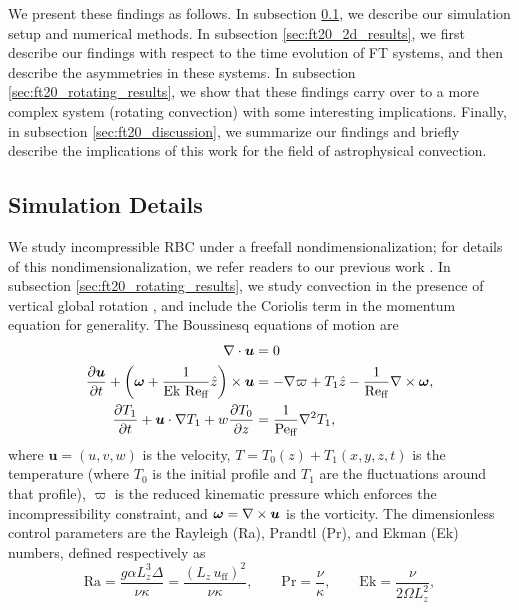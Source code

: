 We present these findings as follows.
In subsection \ref{sec:ft20_simulations}, we describe our simulation setup and numerical methods.
In subsection \ref{sec:ft20_2d_results}, we first describe our findings with respect to the time evolution of FT systems, and then describe the asymmetries in these systems.
In subsection \ref{sec:ft20_rotating_results}, we show that these findings carry over to a more complex system (rotating \RB convection) with some interesting implications.
Finally, in subsection \ref{sec:ft20_discussion}, we summarize our findings and briefly describe the implications of this work for the field of astrophysical convection.


\subsection{Simulation Details}
\label{sec:ft20_simulations}
We study incompressible RBC under a freefall nondimensionalization; for details of this nondimensionalization, we refer readers to our previous work \citep{anders&all2018}.
In subsection \ref{sec:ft20_rotating_results}, we study convection in the presence of vertical global rotation \citep{julien&all1996}, and include the Coriolis term in the momentum equation for generality.
The Boussinesq equations of motion are
\begin{align}
\nabla\cdot\bm{u} &= 0
	\label{eqn:incompressible}
\\
\frac{\partial \bm{u}}{\partial t} + \left(\bm{\omega} + \frac{1}{\text{Ek }\text{Re}_{\text{ff}}}\hat{z}\right)\times\bm{u} 
&= - \nabla \varpi + T_1\hat{z} - \frac{1}{\text{Re}_{\text{ff}}}\nabla\times\bm{\omega},
	\label{eqn:bouss_momentum}
\\
\frac{\partial T_1}{\partial t}  + \bm{u}\cdot\nabla T_1 + w \frac{\partial T_0}{\partial z} 
&= \frac{1}{\text{Pe}_{\text{ff}}}\nabla^2 T_1,
	\label{eqn:bouss_energy}
\end{align}
where $\bm{u} = (u, v, w)$ is the velocity, $T = T_0(z) + T_1(x, y, z, t)$ is the temperature (where $T_0$ is the initial profile and $T_1$ are the fluctuations around that profile), $\varpi$ is the reduced kinematic pressure \citep{anders&all2018} which enforces the incompressibility constraint, and $\bm{\omega} = \nabla \times \bm{u}$ is the vorticity.
The dimensionless control parameters are the Rayleigh (Ra), Prandtl (Pr), and Ekman (Ek) numbers, defined respectively as
\begin{equation}
\text{Ra} = \frac{g \alpha L_z^3 \Delta}{\nu\kappa} = \frac{(L_z\,u_{\text{ff}})^2}{\nu\kappa}, \qquad \text{Pr} = \frac{\nu}{\kappa}, \qquad \text{Ek} = \frac{\nu}{2\Omega L_z^2},
\end{equation}
